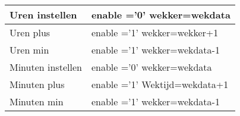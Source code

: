 \documentclass[a4paper, oneside, 10pt]{article}
\begin{document}
\begin{longtable}{|l| p{10cm} |}
Uren instellen &
enable ='0' \newline
wekker=wekdata \\ \hline
Uren plus &
enable ='1' \newline
wekker=wekker+1 \\ \hline
Uren min &
enable ='1' \newline
wekker=wekdata-1 \\ \hline
Minuten instellen &
enable ='0' \newline
wekker=wekdata \\ \hline
Minuten plus &
enable ='1' \newline
Wektijd=wekdata+1 \\ \hline
Minuten min &
enable ='1' \newline
wekker=wekdata-1 \\ \hline
\end{longtable}
\end{document}

